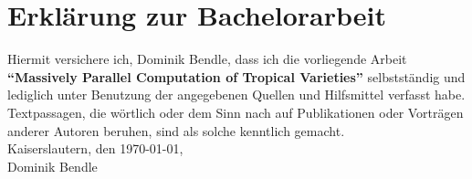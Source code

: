 \documentclass[
  paper=a4,
  titlepage,
  pagesize=pdftex
]{scrartcl}
\begin{document}
  \section*{Erklärung zur Bachelorarbeit}
  Hiermit versichere ich, Dominik Bendle, dass ich die vorliegende Arbeit
  \textbf{\enquote{Massively Parallel Computation of Tropical Varieties}} selbstständig
  und lediglich unter Benutzung der angegebenen Quellen und Hilfsmittel verfasst habe.
  Textpassagen, die wörtlich oder dem Sinn nach auf Publikationen oder Vorträgen anderer
  Autoren beruhen, sind als solche kenntlich gemacht.\\[1em]
  Kaiserslautern, den \today,\\[5em]
  Dominik Bendle
  \thispagestyle{empty}
\end{document}
